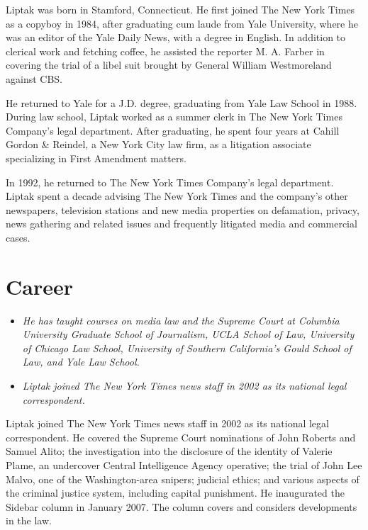 Liptak was born in Stamford, Connecticut. He first joined The New York
Times as a copyboy in 1984, after graduating cum laude from Yale
University, where he was an editor of the Yale Daily News, with a degree
in English. In addition to clerical work and fetching coffee, he
assisted the reporter M. A. Farber in covering the trial of a libel suit
brought by General William Westmoreland against CBS.

He returned to Yale for a J.D. degree, graduating from Yale Law School
in 1988. During law school, Liptak worked as a summer clerk in The New
York Times Company's legal department. After graduating, he spent four
years at Cahill Gordon \& Reindel, a New York City law firm, as a
litigation associate specializing in First Amendment matters.

In 1992, he returned to The New York Times Company's legal department.
Liptak spent a decade advising The New York Times and the company's
other newspapers, television stations and new media properties on
defamation, privacy, news gathering and related issues and frequently
litigated media and commercial cases.

\section{Career}\label{career}

\begin{itemize}
\item
  \emph{He has taught courses on media law and the Supreme Court at
  Columbia University Graduate School of Journalism, UCLA School of Law,
  University of Chicago Law School, University of Southern California's
  Gould School of Law, and Yale Law School.}
\item
  \emph{Liptak joined The New York Times news staff in 2002 as its
  national legal correspondent.}
\end{itemize}

Liptak joined The New York Times news staff in 2002 as its national
legal correspondent. He covered the Supreme Court nominations of John
Roberts and Samuel Alito; the investigation into the disclosure of the
identity of Valerie Plame, an undercover Central Intelligence Agency
operative; the trial of John Lee Malvo, one of the Washington-area
snipers; judicial ethics; and various aspects of the criminal justice
system, including capital punishment. He inaugurated the Sidebar column
in January 2007. The column covers and considers developments in the
law.

